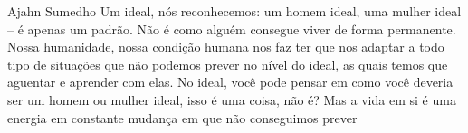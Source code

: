 
\begin{quotepage}{0.6\linewidth}{Ajahn Sumedho}
Um ideal, nós reconhecemos: um homem ideal, uma mulher ideal – é apenas
um padrão. Não é como alguém consegue viver de forma permanente. Nossa
humanidade, nossa condição humana nos faz ter que nos adaptar a todo
tipo de situações que não podemos prever no nível do ideal, as quais
temos que aguentar e aprender com elas. No ideal, você pode pensar em
como você deveria ser um homem ou mulher ideal, isso é uma coisa, não
é? Mas a vida em si é uma energia em constante mudança em que não
conseguimos prever 
\end{quotepage}

